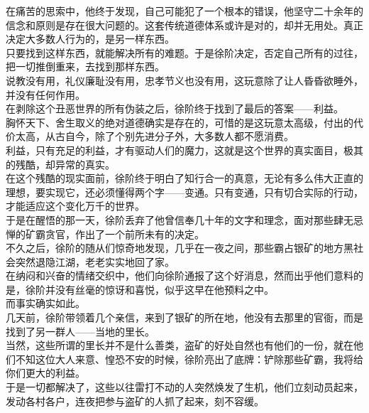 \begin{multicols}{\theparacolNo}
在痛苦的思索中，他终于发现，自己可能犯了一个根本的错误，他坚守二十余年的信念和原则是存在很大问题的。这套传统道德体系或许是对的，却并无用处。真正决定大多数人行为的，是另一样东西。\\

只要找到这样东西，就能解决所有的难题。于是徐阶决定，否定自己所有的过往，把一切推倒重来，去找到那样东西。\\

说教没有用，礼仪廉耻没有用，忠孝节义也没有用，这玩意除了让人昏昏欲睡外，并没有任何作用。\\

在剥除这个丑恶世界的所有伪装之后，徐阶终于找到了最后的答案——利益。\\

胸怀天下、舍生取义的绝对道德确实是存在的，可惜的是这玩意太高级，付出的代价太高，从古自今，除了个别先进分子外，大多数人都不愿消费。\\

利益，只有充足的利益，才有驱动人们的魔力，这就是这个世界的真实面目，极其的残酷，却异常的真实。\\

在这个残酷的现实面前，徐阶终于明白了知行合一的真意，无论有多么伟大正直的理想，要实现它，还必须懂得两个字——变通。只有变通，只有切合实际的行动，才能适应这个变化万千的世界。\\

于是在醒悟的那一天，徐阶丢弃了他曾信奉几十年的文字和理念，面对那些肆无忌惮的矿霸贪官，作出了一个前所未有的决定。\\

不久之后，徐阶的随从们惊奇地发现，几乎在一夜之间，那些霸占银矿的地方黑社会突然退隐江湖，老老实实地回了家。\\

在纳闷和兴奋的情绪交织中，他们向徐阶通报了这个好消息，然而出乎他们意料的是，徐阶并没有丝毫的惊讶和喜悦，似乎这早在他预料之中。\\

而事实确实如此。\\

几天前，徐阶带领着几个亲信，来到了银矿的所在地，他没有去那里的官衙，而是找到了另一群人——当地的里长。\\

当然，这些所谓的里长并不是什么善类，盗矿的好处自然也有他们的一份，就在他们不知这位大人来意、惶恐不安的时候，徐阶亮出了底牌：铲除那些矿霸，我将给你们更大的利益。\\

于是一切都解决了，这些以往雷打不动的人突然焕发了生机，他们立刻动员起来，发动各村各户，连夜把参与盗矿的人抓了起来，刻不容缓。\\


\end{multicols}
